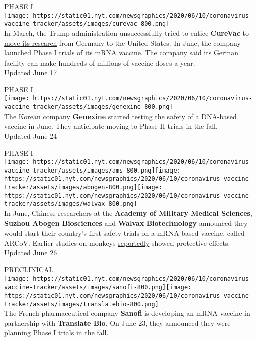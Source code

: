 PHASE I\\
\texttt{[image: https://static01.nyt.com/newsgraphics/2020/06/10/coronavirus-vaccine-tracker/assets/images/curevac-800.png]}\\
In March, the Trump administration unsuccessfully tried to entice
\textbf{CureVac} to
\href{https://www.nytimes.com/2020/03/15/world/europe/cornonavirus-vaccine-us-germany.html}{move
its research} from Germany to the United States. In June, the company
launched Phase I trials of its mRNA vaccine. The company said its German
facility can make hundreds of millions of vaccine doses a year.\\
Updated June 17

PHASE I\\
\texttt{[image: https://static01.nyt.com/newsgraphics/2020/06/10/coronavirus-vaccine-tracker/assets/images/genexine-800.png]}\\
The Korean company \textbf{Genexine} started testing the safety of a
DNA-based vaccine in June. They anticipate moving to Phase II trials in
the fall.\\
Updated June 24

PHASE I\\
\texttt{[image: https://static01.nyt.com/newsgraphics/2020/06/10/coronavirus-vaccine-tracker/assets/images/ams-800.png]}\texttt{[image: https://static01.nyt.com/newsgraphics/2020/06/10/coronavirus-vaccine-tracker/assets/images/abogen-800.png]}\texttt{[image: https://static01.nyt.com/newsgraphics/2020/06/10/coronavirus-vaccine-tracker/assets/images/walvax-800.png]}\\
In June, Chinese researchers at the \textbf{Academy of Military Medical
Sciences}, \textbf{Suzhou Abogen Biosciences} and \textbf{Walvax
Biotechnology} announced they would start their country's first safety
trials on a mRNA-based vaccine, called ARCoV. Earlier studies on monkeys
\href{https://news.cgtn.com/news/2020-06-26/China-s-first-COVID-19-mRNA-vaccine-approved-for-clinical-trials-RDTXX0jVJK/index.html}{reportedly}
showed protective effects.\\
Updated June 26

PRECLINICAL\\
\texttt{[image: https://static01.nyt.com/newsgraphics/2020/06/10/coronavirus-vaccine-tracker/assets/images/sanofi-800.png]}\texttt{[image: https://static01.nyt.com/newsgraphics/2020/06/10/coronavirus-vaccine-tracker/assets/images/translatebio-800.png]}\\
The French pharmaceutical company \textbf{Sanofi} is developing an mRNA
vaccine in partnership with \textbf{Translate Bio}. On June 23, they
announced they were planning Phase I trials in the fall.

